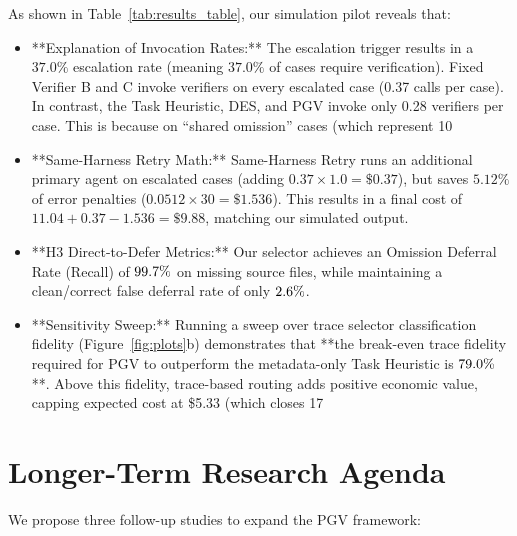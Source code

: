 \documentclass[manuscript,screen,nonacm]{acmart}
\begin{document}
As shown in Table~\ref{tab:results_table}, our simulation pilot reveals that:
\begin{itemize}
    \item **Explanation of Invocation Rates:** The escalation trigger results in a $37.0\%$ escalation rate (meaning $37.0\%$ of cases require verification). Fixed Verifier B and C invoke verifiers on every escalated case (0.37 calls per case). In contrast, the Task Heuristic, DES, and PGV invoke only 0.28 verifiers per case. This is because on ``shared omission'' cases (which represent 10%
    \item **Same-Harness Retry Math:** Same-Harness Retry runs an additional primary agent on escalated cases (adding $0.37 \times 1.0 = \$0.37$), but saves $5.12\%$ of error penalties ($0.0512 \times 30 = \$1.536$). This results in a final cost of $11.04 + 0.37 - 1.536 = \$9.88$, matching our simulated output.
    \item **H3 Direct-to-Defer Metrics:** Our selector achieves an Omission Deferral Rate (Recall) of $99.7\%$ on missing source files, while maintaining a clean/correct false deferral rate of only $2.6\%$.
    \item **Sensitivity Sweep:** Running a sweep over trace selector classification fidelity (Figure~\ref{fig:plots}b) demonstrates that **the break-even trace fidelity required for PGV to outperform the metadata-only Task Heuristic is $79.0\%$**. Above this fidelity, trace-based routing adds positive economic value, capping expected cost at \$5.33 (which closes 17%
\end{itemize}

\section{Longer-Term Research Agenda}
\label{sec:agenda}

We propose three follow-up studies to expand the PGV framework:
\end{document}
